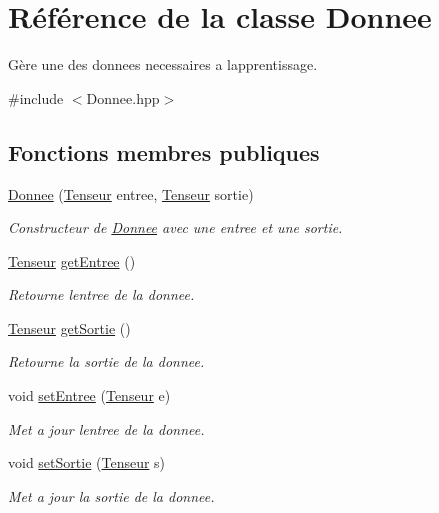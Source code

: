 \hypertarget{class_donnee}{}\section{Référence de la classe Donnee}
\label{class_donnee}


Gère une des donnees necessaires a l\textquotesingle{}apprentissage.  




{\ttfamily \#include $<$Donnee.\+hpp$>$}

\subsection*{Fonctions membres publiques}
\begin{DoxyCompactItemize}
\item 
\mbox{\label{class_donnee_a41bbb1e9a6835479eefa2a694ddd5da3}} 
\hyperlink{class_donnee_a41bbb1e9a6835479eefa2a694ddd5da3}{Donnee} (\hyperlink{class_tenseur}{Tenseur} entree, \hyperlink{class_tenseur}{Tenseur} sortie)
\begin{DoxyCompactList}\small\item\em Constructeur de \hyperlink{class_donnee}{Donnee} avec une entree et une sortie. \end{DoxyCompactList}\item 
\hyperlink{class_tenseur}{Tenseur} \hyperlink{class_donnee_af4b02bb80cd289073f1eb56fc9046c11}{get\+Entree} ()
\begin{DoxyCompactList}\small\item\em Retourne l\textquotesingle{}entree de la donnee. \end{DoxyCompactList}\item 
\hyperlink{class_tenseur}{Tenseur} \hyperlink{class_donnee_aadc9c0ab3f163fa6c0e57daa57023de0}{get\+Sortie} ()
\begin{DoxyCompactList}\small\item\em Retourne la sortie de la donnee. \end{DoxyCompactList}\item 
void \hyperlink{class_donnee_ad8f000cbd829b3f3485cc158b5a92514}{set\+Entree} (\hyperlink{class_tenseur}{Tenseur} e)
\begin{DoxyCompactList}\small\item\em Met a jour l\textquotesingle{}entree de la donnee. \end{DoxyCompactList}\item 
void \hyperlink{class_donnee_adbcb8dc22a69b7c0fffca3dbbef4623b}{set\+Sortie} (\hyperlink{class_tenseur}{Tenseur} s)
\begin{DoxyCompactList}\small\item\em Met a jour la sortie de la donnee. \end{DoxyCompactList}\end{DoxyCompactItemize}


